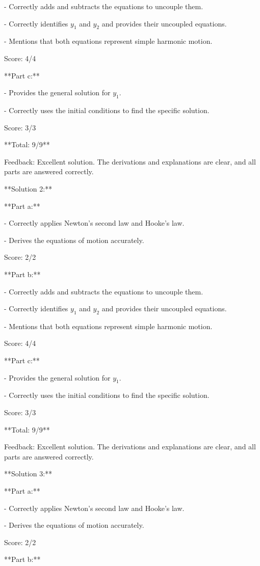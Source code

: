 \documentclass[a4paper,11pt]{article}
\begin{document}
- Correctly adds and subtracts the equations to uncouple them.

- Correctly identifies \(y_1\) and \(y_2\) and provides their uncoupled equations.

- Mentions that both equations represent simple harmonic motion.
  
Score: 4/4

**Part c:**

- Provides the general solution for \(y_1\).

- Correctly uses the initial conditions to find the specific solution.
  
Score: 3/3

**Total: 9/9**

Feedback: Excellent solution. The derivations and explanations are clear, and all parts are answered correctly.

**Solution 2:**

**Part a:**

- Correctly applies Newton's second law and Hooke's law.

- Derives the equations of motion accurately.
  
Score: 2/2

**Part b:**

- Correctly adds and subtracts the equations to uncouple them.

- Correctly identifies \(y_1\) and \(y_2\) and provides their uncoupled equations.

- Mentions that both equations represent simple harmonic motion.
  
Score: 4/4

**Part c:**

- Provides the general solution for \(y_1\).

- Correctly uses the initial conditions to find the specific solution.
  
Score: 3/3

**Total: 9/9**

Feedback: Excellent solution. The derivations and explanations are clear, and all parts are answered correctly.

**Solution 3:**

**Part a:**

- Correctly applies Newton's second law and Hooke's law.

- Derives the equations of motion accurately.
  
Score: 2/2

**Part b:**
\end{document}
